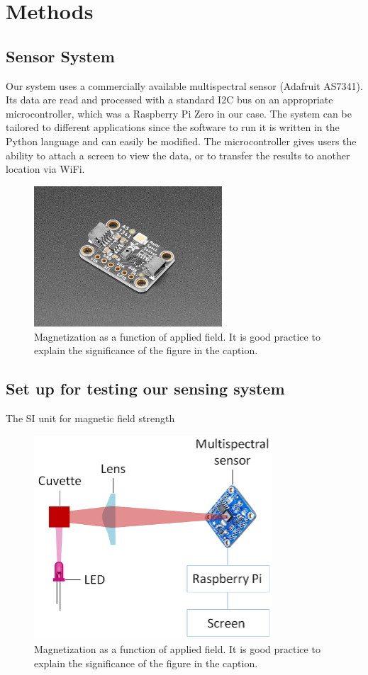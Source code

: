 \documentclass[journal,twoside,web]{ieeecolor}
\begin{document}
\section{Methods}

\subsection{Sensor System}
Our system uses a commercially available multispectral sensor (Adafruit AS7341). Its data are read and processed with a standard I2C bus on an appropriate microcontroller, which was a Raspberry Pi Zero in our case. The system can be tailored to different applications since the software to run it is written in the Python language and can easily be modified. The microcontroller gives users the ability to attach a screen to view the data, or to transfer the results to another location via WiFi.
\begin{figure}[!t]
\centerline{\includegraphics[width=7cm]{469800.jpg}}
\caption{Magnetization as a function of applied field.
It is good practice to explain the significance of the figure in the caption.}
\label{fig3}
\end{figure}

\subsection{Set up for testing our sensing system}
The SI unit for magnetic field strength 

\begin{figure}[!t]
\centerline{\includegraphics{22.png}}
\caption{Magnetization as a function of applied field.
It is good practice to explain the significance of the figure in the caption.}
\label{fig1}
\end{figure}
\end{document}

